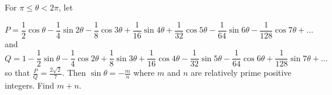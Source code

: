 For $\pi\leq\theta<2\pi$, let

\[ P=\dfrac12\cos\theta-\dfrac14\sin2\theta-\dfrac18\cos3\theta+\dfrac1{16}\sin4\theta+\dfrac1{32}\cos5\theta-\dfrac1{64}\sin6\theta-\dfrac1{128}\cos7\theta+\ldots
\] and
\[ Q=1-\dfrac12\sin\theta-\dfrac14\cos2\theta+\dfrac1{8}\sin3\theta+\dfrac1{16}\cos4\theta-\dfrac1{32}\sin5\theta-\dfrac1{64}\cos6\theta+\dfrac1{128}\sin7\theta
+\ldots \] so that $\tfrac PQ = \tfrac{2\sqrt2}7$. Then $\sin\theta = -\tfrac mn$ where $m$ and $n$ are relatively prime positive integers. Find $m+n$.